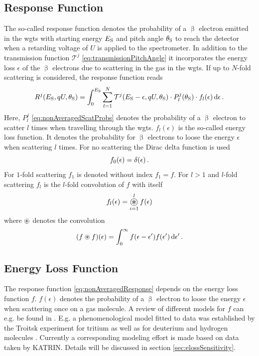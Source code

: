 \subsection{Response Function}
\label{sec:response}
The so-called response function denotes the probability of a $\upbeta$ electron emitted in the \gls{wgts} with starting energy $E_\mathrm{S}$ and pitch angle $\theta_\mathrm{S}$ to reach the detector when a retarding voltage of $U$ is applied to the spectrometer. In addition to the transmission function $\mathcal{T}^j$ \eqref{eq:transmissionPitchAngle} it incorporates the energy loss $\epsilon$ of the $\upbeta$ electrons due to scattering in the gas in the \gls{wgts}. If up to $N$-fold scattering is considered, the response function reads
\begin{equation}
    \label{eq:nonAveragedResponse}
    R^j(E_\mathrm{S}, qU, \theta_\mathrm{S}) = 
    \int_0^{E_\mathrm{S}}
        \sum_{l=1}^{N}
            \mathcal{T}^j(E_\mathrm{S}-\epsilon, qU, \theta_\mathrm{S}) \cdot
            P^j_l(\theta_\mathrm{S}) \cdot f_l(\epsilon)
    \mathop{}\!\mathrm{d} \epsilon
    \text{\,.}
\end{equation}
Here, $P^j_l$ \eqref{eq:nonAveragedScatProbs} denotes the probability of a $\upbeta$ electron to scatter $l$ times when travelling through the \gls{wgts}. $f_l(\epsilon)$ is the so-called energy loss function. It denotes the probability for $\upbeta$ electrons to loose the energy $\epsilon$ when scattering $l$ times. For no scattering the Dirac delta function is used
\begin{equation}
    f_0(\epsilon) = \delta(\epsilon) \text{\,.}
\end{equation}
For $1$-fold scattering $f_1$ is denoted without index $f_1 = f$. For $l>1$ and $l$-fold scattering $f_l$ is the $l$-fold convolution of $f$ with itself
\begin{equation}
    f_l(\epsilon) = \Conv_{i=1}^{l} f(\epsilon)
\end{equation}
where $\circledast$ denotes the convolution
\begin{equation}
    (f \circledast f)(\epsilon) = \int_{0}^{\infty}  f(\epsilon-\epsilon^\prime)f(\epsilon^\prime) \mathop{}\!\mathrm{d} \epsilon^\prime \text{\,.} 
\end{equation}

\subsection{Energy Loss Function}
\label{sec:eloss}
The response function \eqref{eq:nonAveragedResponse} depends on the energy loss function $f$. $f(\epsilon)$ denotes the probability of a $\upbeta$ electron to loose the energy $\epsilon$ when scattering once on a gas molecule. A review of different models for $f$ can e.g. be found in \cite{Trost2019}. E.g. a phenomenological model fitted to data was established by the Troitsk experiment for tritium \cite{Aseev2000} as well as for deuterium and hydrogen molecules \cite{Abdurashitov2017}. Currently a corresponding  modeling effort is made based on data taken by KATRIN. Details will be discussed in section \ref{sec:elossSensitivity}.

